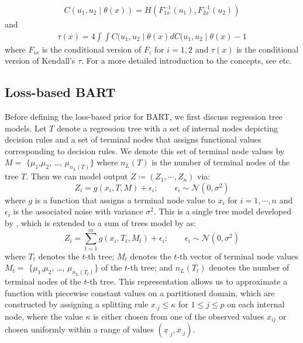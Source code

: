 \documentclass[
12pt]{article}
\begin{document}
	\begin{align*}
		C\left(u_1,u_2\mid \theta(x)\right) = H\left(F_{1x}^{-1}(u_1),F_{2x}^{-1}(u_2)\right)
	\end{align*}
	and
	\begin{align*}
		\tau(x) = 4\int \int C(u_1,u_2\mid \theta(x)dC(u_1,u_2 \mid \theta(x) - 1
	\end{align*}
	where $F_{ix}$ is the conditional version of $F_{i}$ for $i=1,2$ and $\tau(x)$ is the conditional version of Kendall's $\tau$. For a more detailed introduction to the concepts, see \citet{patton2006,acar2010,GIJBELS20111919} etc.
	
	\subsection{Loss-based BART}
	
	Before defining the loss-based prior for BART, we first discuss regression tree models. Let $T$ denote a regression tree \citep{chipman98BCART} with a set of internal nodes depicting decision rules and a set of terminal nodes that assigns functional values corresponding to decision rules. We denote this set of terminal node values by $M =$ $\{\mu_1$,$\mu_2$, \dots, $\mu_{n_L(T)}\}$ where $n_L(T)$ is the number of terminal nodes of the tree $T$. Then we can model output $Z\coloneqq(Z_1,\cdots,Z_n)$ via:
	\begin{equation*}
		Z_i = g(x_i, T, M) + \epsilon_i; \qquad \epsilon_i\sim \mathcal{N}(0,\sigma^2)
	\end{equation*} 
	where $g$ is a function that assigns a terminal node value to $x_i$ for $i=1,\cdots,n$ and $\epsilon_i$ is the associated noise with variance $\sigma^2$. This is a single tree model developed by \citet{chipman98BCART}, which is extended to a sum of trees model by \citet{chipman2010BART} as:
	\begin{equation}\label{eq:BART}
		Z_i = \sum_{t=1}^m g(x_i, T_t, M_t) + \epsilon_i; \qquad \epsilon_i\sim \mathcal{N}(0,\sigma^2)
	\end{equation}
	where $T_t$ denotes the $t$-th tree; $M_t$ denotes the $t$-th vector of terminal node values $M_t =$ $\{\mu_1$,$\mu_2$, \dots, $\mu_{n_L(T_t)}\}$ of the $t$-th tree; and $n_L(T_t)$ denotes the number of terminal nodes of the $t$-th tree. This representation allows us to approximate a function with piecewise constant values on a partitioned domain, which are constructed by assigning a splitting rule $x_{\cdot j}\le \kappa$ for $1\le j \le p$ on each internal node, where the value $\kappa$ is either chosen from one of the observed values $x_{ij}$ or chosen uniformly within a range of values $(\underline{x}_{\cdot j},\overline{x}_{\cdot j})$.
	
\end{document}
